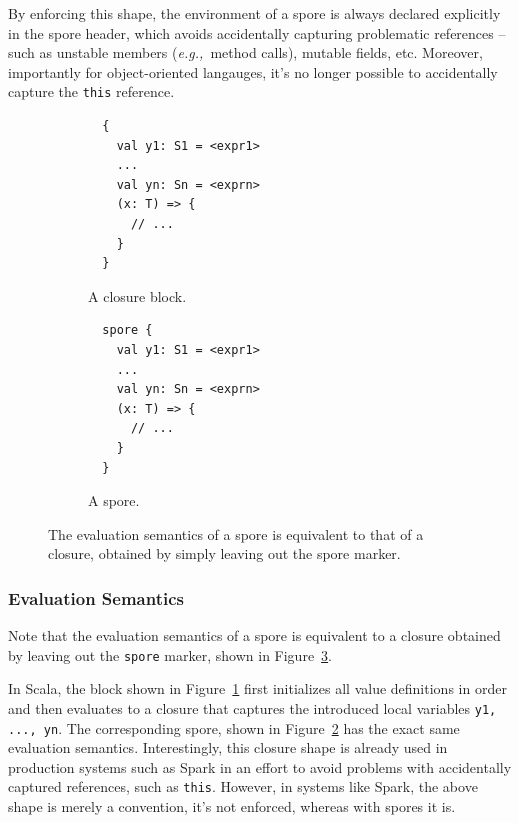 \documentclass{llncs}
\newcommand{\eg}{{\em e.g.,~}}
\begin{document}
By enforcing this shape, the environment of a spore is always declared
explicitly in the spore header, which avoids accidentally capturing
problematic references -- such as unstable members (\eg method calls), mutable
fields, etc. Moreover, importantly for object-oriented langauges, it's no
longer possible to accidentally capture the \verb|this| reference.

\begin{figure}%
\begin{subfigure}{.5\textwidth}
  \centering
  \begin{lstlisting}
  {
    val y1: S1 = <expr1>
    ...
    val yn: Sn = <exprn>
    (x: T) => {
      // ...
    }
  }
  \end{lstlisting}
  \caption{A closure block.}
  \label{fig:normal-block}
\end{subfigure}%
\begin{subfigure}{.5\textwidth}
  \centering
  \begin{lstlisting}
  spore {
    val y1: S1 = <expr1>
    ...
    val yn: Sn = <exprn>
    (x: T) => {
      // ...
    }
  }
  \end{lstlisting}
  \caption{A spore.}
  \label{fig:normal-spore-shape}
\end{subfigure}%
\caption{The evaluation semantics of a spore is equivalent to that of a closure, obtained by simply leaving out the spore marker.}
\label{fig:evaluation-semantics}
\vspace{-5mm}
\end{figure}


\subsubsection{Evaluation Semantics}

Note that the evaluation semantics of a spore is equivalent to a closure
obtained by leaving out the \verb|spore| marker, shown in
Figure~\ref{fig:evaluation-semantics}.

In Scala, the block shown in Figure~\ref{fig:normal-block} first initializes
all value definitions in order and then evaluates to a closure that captures
the introduced local variables \verb|y1, ..., yn|. The corresponding spore,
shown in Figure~\ref{fig:normal-spore-shape} has the exact same evaluation
semantics. Interestingly, this closure shape is already used in production
systems such as Spark in an effort to avoid problems with accidentally
captured references, such as \verb|this|. However, in systems like Spark, the
above shape is merely a convention, it's not enforced, whereas with spores it
is.
\end{document}
